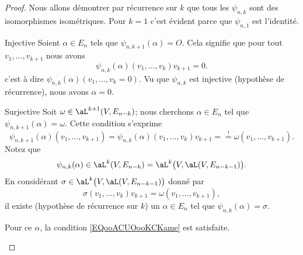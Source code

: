 \begin{proof}
    Nous allons démontrer par récurrence sur \( k\) que tous les \( \psi_{n,k}\) sont des isomorphismes isométriques. Pour \( k=1\) c'est évident parce que \( \psi_{n,1}\) est l'identité.

    \begin{subproof}
        \item[Injective]
            Soient \( \alpha\in E_n\) tels que \( \psi_{n,k+1}(\alpha)=O\). Cela signifie que pour tout \( v_1,\ldots, v_{k+1}\) nous avons
            \begin{equation}
                \psi_{n,k}(\alpha)(v_1,\ldots, v_k)v_{k+1}=0.
            \end{equation}
            c'est à dire \( \psi_{n,k}(\alpha)(v_1,\ldots, v_{k}=0)\). Vu que \( \psi_{n,k}\) est injective (hypothèse de récurrence), nous avons \( \alpha=0\).

        \item[Surjective]
            Soit \( \omega\in \aL^{k+1}(V,E_{n-k})\); nous cherchons \( \alpha\in E_n\) tel que \( \psi_{n,k+1}(\alpha)=\omega\). Cette condition s'exprime
            \begin{equation}        \label{EQooACUOooKCKame}
                \psi_{n,k+1}(\alpha)(v_1,\ldots, v_{k+1})=\psi_{n,k}(\alpha)(v_1,\ldots, v_k)v_{k+1}=\stackrel{!}{=}\omega(v_1,\ldots, v_{k+1}).
            \end{equation}
            Notez que
            \begin{equation}
                \psi_{n,k}(\alpha)\in \aL^k(V,E_{n-k})=\aL^k\big( V,\aL(V,E_{n-k-1}) \big).
            \end{equation}
            En considérant \( \sigma\in \aL^k\big( V,\aL(V,E_{n-k-1}) \big)\) donné par
            \begin{equation}
                \sigma(v_1,\ldots, v_k)v_{k+1}=\omega(v_1,\ldots, v_{k+1}),
            \end{equation}
            il existe (hypothèse de récurrence sur \( k\)) un \( \alpha\in E_n\) tel que \( \psi_{n,k}(\alpha)=\sigma\).

            Pour ce \( \alpha\), la condition \eqref{EQooACUOooKCKame} est satisfaite.


\end{subproof}
\end{proof}
